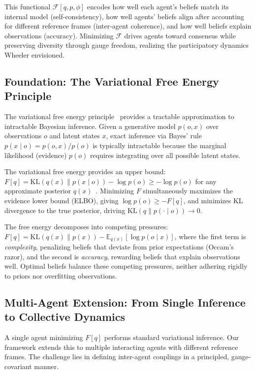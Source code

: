 \documentclass[11pt]{article}
\begin{document}
This functional $\mathcal{F}[q, p, \phi]$ encodes how well each agent's beliefs match its internal model (self-consistency), how well agents' beliefs align after accounting for different reference frames (inter-agent coherence), and how well beliefs explain observations (accuracy). Minimizing $\mathcal{F}$ drives agents toward consensus while preserving diversity through gauge freedom, realizing the participatory dynamics Wheeler envisioned.

\subsection{Foundation: The Variational Free Energy Principle}

The variational free energy principle~\cite{Friston2010,Parr2022} provides a tractable approximation to intractable Bayesian inference. Given a generative model $p(o, x)$ over observations $o$ and latent states $x$, exact inference via Bayes' rule $p(x \mid o) = p(o, x)/p(o)$ is typically intractable because the marginal likelihood (evidence) $p(o)$ requires integrating over all possible latent states.

The variational free energy provides an upper bound: $F[q] = \mathrm{KL}(q(x) \| p(x \mid o)) - \log p(o) \geq -\log p(o)$ for any approximate posterior $q(x)$~\cite{Friston2010,Parr2022}. Minimizing $F$ simultaneously maximizes the evidence lower bound (ELBO), giving $\log p(o) \geq -F[q]$, and minimizes KL divergence to the true posterior, driving $\mathrm{KL}(q \| p(\cdot \mid o)) \to 0$.

The free energy decomposes into competing pressures: $F[q] = \mathrm{KL}(q(x) \| p(x)) - \mathbb{E}_{q(x)}[\log p(o \mid x)]$, where the first term is \emph{complexity}, penalizing beliefs that deviate from prior expectations (Occam's razor), and the second is \emph{accuracy}, rewarding beliefs that explain observations well. Optimal beliefs balance these competing pressures, neither adhering rigidly to priors nor overfitting observations.

\subsection{Multi-Agent Extension: From Single Inference to Collective Dynamics}

A single agent minimizing $F[q]$ performs standard variational inference. Our framework extends this to multiple interacting agents with different reference frames. The challenge lies in defining inter-agent couplings in a principled, gauge-covariant manner.
\end{document}
